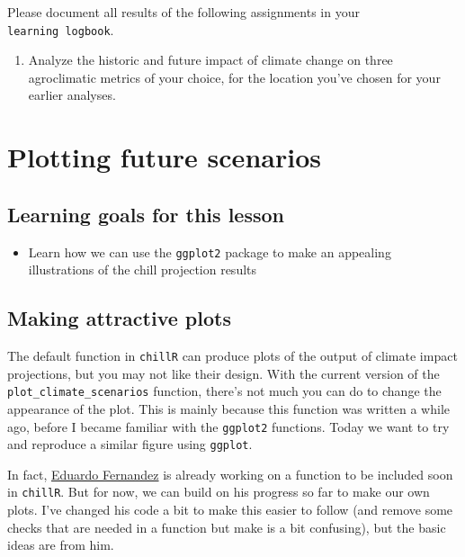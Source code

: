 \documentclass[
]{book}
\providecommand{\tightlist}{%
  \setlength{\itemsep}{0pt}\setlength{\parskip}{0pt}}
\begin{document}
Please document all results of the following assignments in your \texttt{learning\ logbook}.

\begin{enumerate}
\def\labelenumi{\arabic{enumi})}
\tightlist
\item
  Analyze the historic and future impact of climate change on three agroclimatic metrics of your choice, for the location you've chosen for your earlier analyses.
\end{enumerate}

\hypertarget{plot_future}{%
\chapter{Plotting future scenarios}\label{plot_future}}

\hypertarget{goals_future_plots}{%
\section*{Learning goals for this lesson}\label{goals_future_plots}}

\begin{itemize}
\tightlist
\item
  Learn how we can use the \texttt{ggplot2} package to make an appealing illustrations of the chill projection results
\end{itemize}

\hypertarget{making-attractive-plots}{%
\section{Making attractive plots}\label{making-attractive-plots}}

The default function in \texttt{chillR} can produce plots of the output of climate impact projections, but you may not like their design. With the current version of the \texttt{plot\_climate\_scenarios} function, there's not much you can do to change the appearance of the plot. This is mainly because this function was written a while ago, before I became familiar with the \texttt{ggplot2} functions. Today we want to try and reproduce a similar figure using \texttt{ggplot}.

In fact, \href{https://scholar.google.de/citations?hl=de\&user=ibSma_AAAAAJ}{Eduardo Fernandez} is already working on a function to be included soon in \texttt{chillR}. But for now, we can build on his progress so far to make our own plots. I've changed his code a bit to make this easier to follow (and remove some checks that are needed in a function but make is a bit confusing), but the basic ideas are from him.
\end{document}
